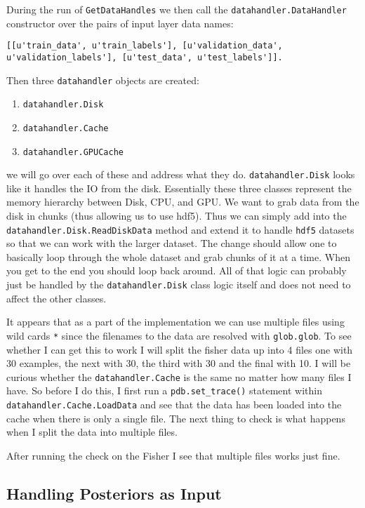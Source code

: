 \documentclass{article} %
\begin{document}
During the run of \texttt{GetDataHandles} we then call the \texttt{datahandler.DataHandler} constructor
over the pairs of input layer data names:
\begin{verbatim}
[[u'train_data', u'train_labels'], [u'validation_data', u'validation_labels'], [u'test_data', u'test_labels']].
\end{verbatim}
Then three \texttt{datahandler} objects are created:
\begin{enumerate}
\item \texttt{datahandler.Disk}
\item \texttt{datahandler.Cache}
\item \texttt{datahandler.GPUCache}
\end{enumerate}
we will go over each of these and address what they do. \texttt{datahandler.Disk} looks like it handles the 
IO from the disk.  Essentially these three classes represent the memory hierarchy between Disk, CPU,
and GPU.  We want to grab data from the disk in chunks (thus allowing us to use hdf5).  Thus we can simply add
into the \texttt{datahandler.Disk.ReadDiskData} method and extend it to handle \texttt{hdf5} datasets
so that we can work with the larger dataset.  The change should allow one to basically loop through the whole
dataset and grab chunks of it at a time.  When you get to the end you should loop back around.  All of that logic
can probably just be handled by the \texttt{datahandler.Disk} class logic itself and does not need to affect the other
classes.

It appears that as a part of the implementation we can use multiple files using wild cards \texttt{*} since the filenames to the
data are resolved with \texttt{glob.glob}.  To see whether I can get this to work I will split the fisher data up into 4 files
one with 30 examples, the next with 30, the third with 30 and the final with 10.  I will be curious whether the \texttt{datahandler.Cache}
is the same no matter how many files I have. So before I do this, I first run a \texttt{pdb.set\_trace()} statement within
\texttt{datahandler.Cache.LoadData} and see that the data has been loaded into the cache when there is  only a single file. 
The next thing to check is what happens when I split the data into multiple files.

After running the check on the Fisher I see that multiple files works just fine.

\subsection{Handling Posteriors as Input}
\end{document}
